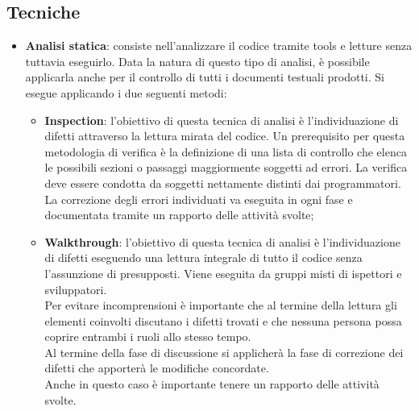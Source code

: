 {\subsection {Tecniche}{
	\begin{itemize}
		\item \textbf{Analisi statica}: consiste nell’analizzare il codice tramite tools e letture senza tuttavia eseguirlo. Data la natura di questo tipo di analisi, è possibile applicarla anche per il controllo di tutti i documenti testuali prodotti.
		Si esegue applicando i due seguenti metodi:
		\begin{itemize}
			\item \textbf{Inspection}: l’obiettivo di questa tecnica di analisi è l’individuazione di difetti attraverso la lettura mirata del codice. Un prerequisito per questa metodologia di verifica è la definizione di una lista di controllo che elenca le possibili sezioni o passaggi maggiormente soggetti ad errori. La verifica deve essere condotta da soggetti nettamente distinti dai programmatori. La correzione degli errori individuati va eseguita in ogni fase e documentata tramite un rapporto delle attività svolte;
			
			\item \textbf{Walkthrough}: l'obiettivo di questa tecnica di analisi è l'individuazione di difetti eseguendo una lettura integrale di tutto il codice senza l'assunzione di presupposti. Viene eseguita da gruppi misti di ispettori e sviluppatori. \\
			Per evitare incomprensioni è importante che al termine della lettura gli elementi coinvolti discutano i difetti trovati e che nessuna persona possa coprire entrambi i ruoli allo stesso tempo. \\
			Al termine della fase di discussione si applicherà la fase di correzione dei difetti che apporterà le modifiche concordate.  \\
			Anche in questo caso è importante tenere un rapporto delle attività svolte.
		\end{itemize}
		

\end{itemize}}}

